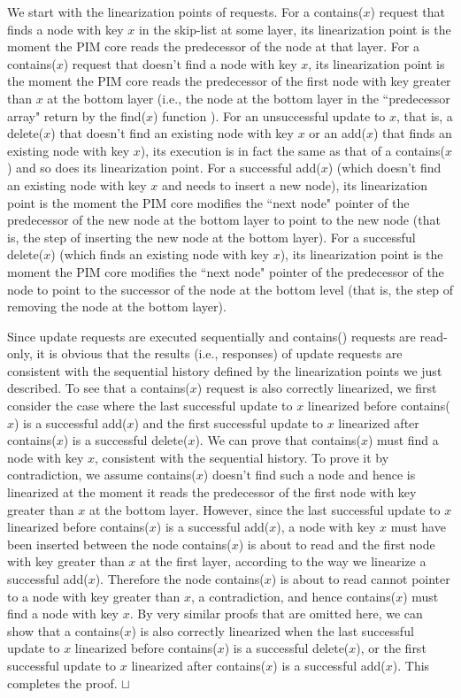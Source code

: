 \documentclass[11pt]{article}
\newcommand{\sq}{\hbox{\rlap{$\sqcap$}$\sqcup$}}
\newcommand{\qed}{\hspace*{\fill}\sq}
\begin{document}
We start with the linearization points of requests. 
For a contains($x$) request that finds a node with key $x$ in the skip-list at some layer, 
its linearization point is the moment the PIM core reads the predecessor of the node at that layer. 
For a contains($x$) request that doesn't find a node with key $x$, its linearization point is the moment 
the PIM core reads the predecessor of the first node with key greater than $x$ at the bottom layer 
(i.e., the node at the bottom layer in the ``predecessor array" return by the find($x$) function \cite{Herlihy08}). 
For an unsuccessful update to $x$, that is, a delete($x$) that doesn't find an existing node with key $x$ 
or an add($x$) that finds an existing node with key $x$), 
its execution is in fact the same as that of a contains($x$) and so does its linearization point. 
For a successful add($x$) (which doesn't find an existing node with key $x$ and needs to insert a new node), 
its linearization point is the moment the PIM core modifies the ``next node" pointer of the predecessor 
of the new node at the bottom layer to point to the new node 
(that is, the step of inserting the new node at the bottom layer).  
For a successful delete($x$) (which finds an existing node with key $x$), its linearization point is 
the moment the PIM core modifies the ``next node" pointer of the predecessor of the node to point to 
the successor of the node at the bottom level (that is, the step of removing the node at the bottom layer). 

Since update requests are executed sequentially and contains() requests are read-only, 
it is obvious that the results (i.e., responses) of update requests are consistent 
with the sequential history defined by the linearization points we just described. 
To see that a contains($x$) request is also correctly linearized, we first consider the case where 
the last successful update to $x$ linearized before contains($x$) is a successful add($x$) and 
the first successful update to $x$ linearized after contains($x$) is a successful delete($x$). 
We can prove that contains($x$) must find a node with key $x$, consistent with the sequential history. 
To prove it by contradiction, we assume contains($x$) doesn't find such a node and hence is linearized 
at the moment it reads the predecessor of the first node with key greater than $x$ at the bottom layer. 
However, since the last successful update to $x$ linearized before contains($x$) is a successful add($x$), 
a node with key $x$ must have been inserted between the node contains($x$) is about to read and the first 
node with key greater than $x$ at the first layer, according to the way we linearize a successful add($x$). 
Therefore the node contains($x$) is about to read cannot pointer to a node with key greater than $x$, 
a contradiction, and hence contains($x$) must find a node with key $x$. 
By very similar proofs that are omitted here, we can show that a contains($x$) is also correctly linearized 
when the last successful update to $x$ linearized before contains($x$) is a successful delete($x$), or
the first successful update to $x$ linearized after contains($x$) is a successful add($x$). 
This completes the proof. 
\qed
\end{document}
